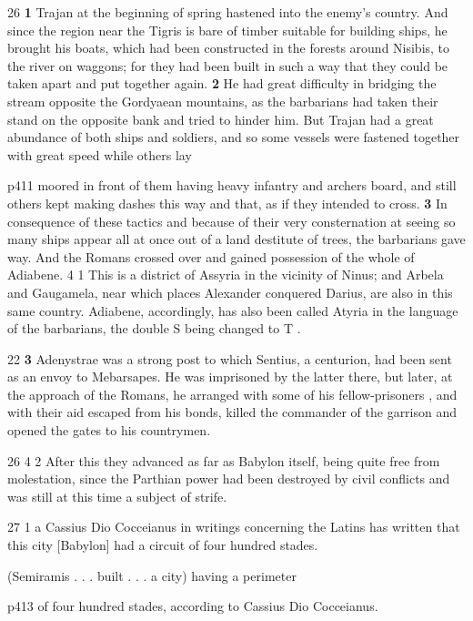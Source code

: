 26
\textbf{1} Trajan at the beginning of spring hastened into the enemy's country. And since the region near the Tigris is bare of timber suitable for building ships, he brought his boats, which had been constructed in the forests around Nisibis, to the river on waggons; for they had been built in such a way that they could be taken apart and put together again. \textbf{2} He had great difficulty in bridging the stream opposite the Gordyaean mountains, as the barbarians had taken their stand on the opposite bank and tried to hinder him. But Trajan had a great abundance of both ships and soldiers, and so some vessels were fastened together with great speed while others lay

p411 moored in front of them having heavy infantry and archers board, and still others kept making dashes this way and that, as if they intended to cross. \textbf{3} In consequence of these tactics and because of their very consternation at seeing so many ships appear all at once out of a land destitute of trees, the barbarians gave way. And the Romans crossed over and gained possession of the whole of Adiabene. 4 1 This is a district of Assyria in the vicinity of Ninus; and Arbela and Gaugamela, near which places Alexander conquered Darius, are also in this same country. Adiabene, accordingly, has also been called Atyria in the language of the barbarians, the double S being changed to T .

22
\textbf{3} Adenystrae was a strong post to which Sentius, a centurion, had been sent as an envoy to Mebarsapes. He was imprisoned by the latter there, but later, at the approach of the Romans, he arranged with some of his fellow-prisoners , and with their aid escaped from his bonds, killed the commander of the garrison and opened the gates to his countrymen.

26
4 2 After this they advanced as far as Babylon itself, being quite free from molestation, since the Parthian power had been destroyed by civil conflicts and was still at this time a subject of strife.

27
1 a Cassius Dio Cocceianus in writings concerning the Latins has written that this city [Babylon] had a circuit of four hundred stades.

(Semiramis . . . built . . . a city) having a perimeter

p413 of four hundred stades, according to Cassius Dio Cocceianus.

